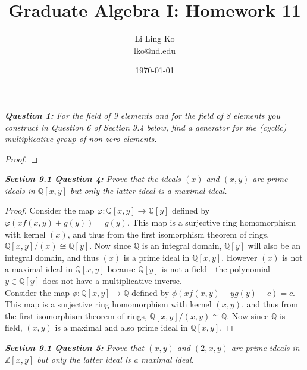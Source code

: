 \documentclass{article}
\begin{document}
\title{Graduate Algebra I: Homework 11}
\author{Li Ling Ko\\ lko@nd.edu}
\date{\today}
\maketitle

\it \textbf{Question 1:} For the field of 9 elements and for the field of 8
  elements you construct in Question 6 of Section 9.4 below, find a
  generator for the (cyclic) multiplicative group of non-zero elements.
  \begin{proof}
  \end{proof}

\it \textbf{Section 9.1 Question 4:} Prove that the ideals $(x)$ and
  $(x,y)$ are prime ideals in $\mathbb{Q}[x,y]$ but only the latter ideal
  is a maximal ideal.

  \begin{proof}
    Consider the map $\varphi:\mathbb{Q}[x,y]\rightarrow\mathbb{Q}[y]$
    defined by $\varphi(xf(x,y)+g(y))=g(y)$. This map is a surjective ring
    homomorphism with kernel $(x)$, and thus from the first isomorphism
    theorem of rings, $\mathbb{Q}[x,y]/(x)\cong\mathbb{Q}[y]$. Now since
    $\mathbb{Q}$ is an integral domain, $\mathbb{Q}[y]$ will also be an
    integral domain, and thus $(x)$ is a prime ideal in $\mathbb{Q}[x,y]$.
    However $(x)$ is not a maximal ideal in $\mathbb{Q}[x,y]$ because
    $\mathbb{Q}[y]$ is not a field - the polynomial $y\in\mathbb{Q}[y]$
    does not have a multiplicative inverse. \\

    Consider the map $\phi:\mathbb{Q}[x,y]\rightarrow\mathbb{Q}$
    defined by $\phi(xf(x,y)+yg(y)+c)=c$. This map is a surjective ring
    homomorphism with kernel $(x,y)$, and thus from the first isomorphism
    theorem of rings, $\mathbb{Q}[x,y]/(x,y)\cong\mathbb{Q}$. Now since
    $\mathbb{Q}$ is field, $(x,y)$ is a maximal and also prime ideal in
    $\mathbb{Q}[x,y]$.
  \end{proof}

\it \textbf{Section 9.1 Question 5:} Prove that $(x,y)$ and $(2,x,y)$ are
  prime ideals in $\mathbb{Z}[x,y]$ but only the latter ideal is a maximal
  ideal.
\end{document}
